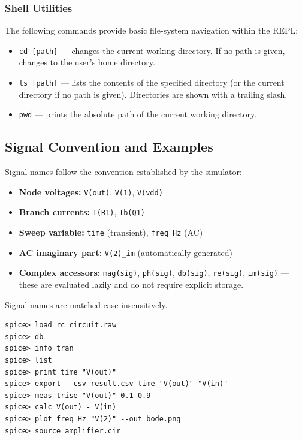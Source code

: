 \subsubsection{Shell Utilities}
The following commands provide basic file-system navigation within the REPL:

\begin{itemize}
  \item \texttt{cd [path]} --- changes the current working directory. If no path is given, changes to the user's home directory.
  \item \texttt{ls [path]} --- lists the contents of the specified directory (or the current directory if no path is given). Directories are shown with a trailing slash.
  \item \texttt{pwd} --- prints the absolute path of the current working directory.
\end{itemize}

\subsection{Signal Convention and Examples}

Signal names follow the convention established by the simulator:
\begin{itemize}
  \item \textbf{Node voltages:} \texttt{V(out)}, \texttt{V(1)}, \texttt{V(vdd)}
  \item \textbf{Branch currents:} \texttt{I(R1)}, \texttt{Ib(Q1)}
  \item \textbf{Sweep variable:} \texttt{time} (transient), \texttt{freq\_Hz} (AC)
  \item \textbf{AC imaginary part:} \texttt{V(2)\_im} (automatically generated)
  \item \textbf{Complex accessors:} \texttt{mag(sig)}, \texttt{ph(sig)}, \texttt{db(sig)}, \texttt{re(sig)}, \texttt{im(sig)} --- these are evaluated lazily and do not require explicit storage.
\end{itemize}
Signal names are matched case-insensitively.

\begin{lstlisting}[style=spicerepl, keywords={load, db, info, list, print, export, meas, calc, plot, source}]
spice> load rc_circuit.raw
spice> db
spice> info tran
spice> list
spice> print time "V(out)"
spice> export --csv result.csv time "V(out)" "V(in)"
spice> meas trise "V(out)" 0.1 0.9
spice> calc V(out) - V(in)
spice> plot freq_Hz "V(2)" --out bode.png
spice> source amplifier.cir
\end{lstlisting}

